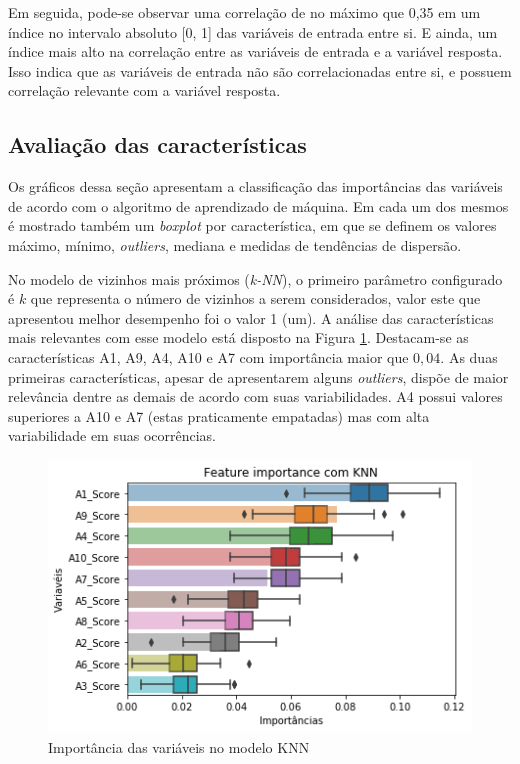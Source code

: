 \documentclass{template/sig-alternate-05-2015}
\begin{document}
    Em seguida, pode-se observar uma correlação de no máximo que 0,35
    em um índice no intervalo absoluto [0, 1] das variáveis de entrada
    entre si. E ainda, um índice mais alto na correlação entre as
    variáveis de entrada e a variável resposta. Isso indica que as
    variáveis de entrada não são correlacionadas entre si, e possuem
    correlação relevante com a variável resposta.

    \subsection{Avaliação das características}\label{sec:5.2}

    Os gráficos dessa seção apresentam a classificação das
    importâncias das variáveis de acordo com o algoritmo de
    aprendizado de máquina. Em cada um dos mesmos é mostrado também um
    \textit{boxplot} por característica, em que se definem os valores
    máximo, mínimo, \textit{outliers}, mediana e medidas de tendências
    de dispersão.


    No modelo de vizinhos mais próximos (\emph{k-NN}), o primeiro
    parâmetro configurado é $k$ que representa o número de vizinhos a
    serem considerados, valor este que apresentou melhor desempenho
    foi o valor 1 (um). A análise das características mais relevantes
    com esse modelo está disposto na Figura \ref{fig:knn}. Destacam-se
    as características A1, A9, A4, A10 e A7 com importância maior que
    $0,04$. As duas primeiras características, apesar de apresentarem
    alguns \textit{outliers}, dispõe de maior relevância dentre as
    demais de acordo com suas variabilidades. A4 possui valores
    superiores a A10 e A7 (estas praticamente empatadas) mas com alta
    variabilidade em suas ocorrências.

    \begin{figure}[!h]
      \centering
      \includegraphics[width=.5\textwidth]{imagens/box_knn.png}
      \caption{Importância das variáveis no modelo KNN}
      \label{fig:knn}
    \end{figure}
\end{document}
